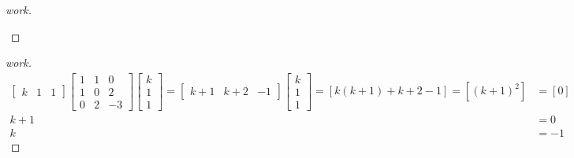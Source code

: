 \documentclass{article}
\begin{document}
\begin{enumerate}
{\begin{enumerate}
\begin{proof}[work]
\begin{enumerate}
        \end{enumerate}
      \end{proof}
    \end{enumerate}
  }
  \begin{proof}[work]
    \begin{align*}
      \begin{bmatrix}
        k & 1 & 1
      \end{bmatrix}
      \begin{bmatrix}
        1 & 1 & 0  \\
        1 & 0 & 2  \\
        0 & 2 & -3
      \end{bmatrix}
      \begin{bmatrix}
        k \\ 1 \\ 1
      \end{bmatrix} =
      \begin{bmatrix}
        k+1 & k+2 & -1
      \end{bmatrix}
      \begin{bmatrix}
        k \\ 1 \\ 1
      \end{bmatrix} =
      \left[k(k + 1) + k + 2 - 1\right] = \left[(k+1)^2\right] & = \left[0\right] \\
      k + 1                                                    & = 0              \\
      k                                                        & = -1
    \end{align*}
  \end{proof}
\end{enumerate}
\end{document}
